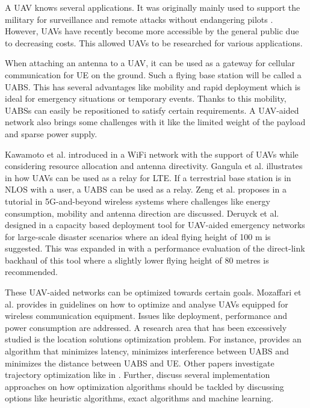 A \gls{UAV} knows several applications. It was originally mainly used to support the military for surveillance and remote attacks without 
endangering pilots \cite{U12}. However, \gls{UAV}s have recently become more accessible by the general public due to decreasing costs. This 
allowed \gls{UAV}s to be researched for various applications.

When attaching an antenna to a \gls{UAV}, it can be used as a gateway for cellular communication for \gls{UE} on the ground.
Such a flying base station will be called a \gls{UABS}. 
This has several advantages like mobility and rapid deployment which is ideal for emergency situations or temporary events. Thanks to this mobility,  
\gls{UABS}s can easily be repositioned to satisfy certain requirements. A \gls{UAV}-aided network also brings some challenges with it like 
the limited weight of the payload and sparse power supply.

Kawamoto et al. introduced in \cite{U11} a WiFi network with the support of  \gls{UAV}s while considering resource allocation 
and antenna directivity. 
Gangula et al. illustrates in \cite{U10} how \gls{UAV}s can be  used as a relay for \gls{LTE}. 
If a terrestrial base station is in \gls{NLOS} with a user, a
\gls{UABS} can be used as a relay.
Zeng et al. proposes in  \cite{U12} a tutorial in 5G-and-beyond wireless systems where challenges like 
energy consumption, mobility and antenna direction are discussed. 
Deruyck et al. designed in \cite{J2} a capacity based deployment tool for UAV-aided emergency
networks for large-scale disaster scenarios where an ideal flying height of 100 m is suggested. This was expanded 
in \cite{U1} with a performance evaluation of the direct-link backhaul of this tool where a slightly lower 
flying height of 80 metres is recommended.

These \gls{UAV}-aided networks can be optimized towards certain goals.
Mozaffari et al. provides in \cite{U3} guidelines on how to optimize and analyse \gls{UAV}s equipped for 
wireless communication equipment. Issues like deployment, performance and power consumption are addressed.
A research area that has been excessively studied is the location solutions optimization problem.
For instance, \cite{U4} provides an algorithm that minimizes latency, \cite{U7,U9}  minimizes interference between \gls{UABS} and \cite{U8} minimizes the 
distance between \gls{UABS} and \gls{UE}. Other papers investigate trajectory optimization like in \cite{U7,U6}.
Further, \cite{U3,U5} discuss several implementation approaches on how optimization algorithms should be tackled by discussing options like 
heuristic algorithms, \gls{exact algorithm}s and machine learning. 

